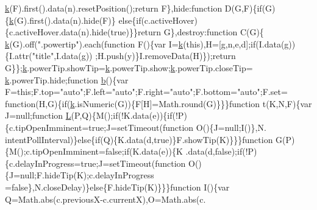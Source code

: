 \begin{DoxyCode}
      \hyperlink{jquery_8js_ab26645c014aa005ecedef329ecf58c99}{k}(F).first().data(n).resetPosition();\textcolor{keywordflow}{return} F\},hide:\textcolor{keyword}{function} D(G,F)\{\textcolor{keywordflow}{if}(G)\{\hyperlink{jquery_8js_ab26645c014aa005ecedef329ecf58c99}{k}(G).first().data(n).hide(F)\}\textcolor{keywordflow}{
      else}\{\textcolor{keywordflow}{if}(c.activeHover)\{c.activeHover.data(n).hide(\textcolor{keyword}{true})\}\}\textcolor{keywordflow}{return} G\},destroy:\textcolor{keyword}{function} C(G)\{
      \hyperlink{jquery_8js_ab26645c014aa005ecedef329ecf58c99}{k}(G).off(\textcolor{stringliteral}{".powertip"}).each(\textcolor{keyword}{function} F()\{var I=\hyperlink{jquery_8js_ab26645c014aa005ecedef329ecf58c99}{k}(\textcolor{keyword}{this}),H=[g,n,e,d];\textcolor{keywordflow}{if}(I.data(g))\{I.attr(\textcolor{stringliteral}{"title"},I.data(g))
      ;H.push(y)\}I.removeData(H)\});\textcolor{keywordflow}{return} G\}\};\hyperlink{jquery_8js_ab26645c014aa005ecedef329ecf58c99}{k}.powerTip.showTip=\hyperlink{jquery_8js_ab26645c014aa005ecedef329ecf58c99}{k}.powerTip.show;\hyperlink{jquery_8js_ab26645c014aa005ecedef329ecf58c99}{k}.powerTip.closeTip=
      \hyperlink{jquery_8js_ab26645c014aa005ecedef329ecf58c99}{k}.powerTip.hide;\textcolor{keyword}{function} \hyperlink{jquery_8js_aa4026ad5544b958e54ce5e106fa1c805}{b}()\{var F=\textcolor{keyword}{this};F.top=\textcolor{stringliteral}{"auto"};F.left=\textcolor{stringliteral}{"auto"};F.right=\textcolor{stringliteral}{"auto"};F.bottom=\textcolor{stringliteral}{"auto"};F.set=\textcolor{keyword}{
      function}(H,G)\{\textcolor{keywordflow}{if}(\hyperlink{jquery_8js_ab26645c014aa005ecedef329ecf58c99}{k}.isNumeric(G))\{F[H]=Math.round(G)\}\}\}\textcolor{keyword}{function} t(K,N,F)\{var J=null;\textcolor{keyword}{function} 
      \hyperlink{jquery_8js_a38ee4c0b5f4fe2a18d0c783af540d253}{L}(P,Q)\{M();\textcolor{keywordflow}{if}(!K.data(e))\{\textcolor{keywordflow}{if}(!P)\{c.tipOpenImminent=\textcolor{keyword}{true};J=setTimeout(\textcolor{keyword}{function} O()\{J=null;I()\},N.
      intentPollInterval)\}\textcolor{keywordflow}{else}\{\textcolor{keywordflow}{if}(Q)\{K.data(d,\textcolor{keyword}{true})\}F.showTip(K)\}\}\}\textcolor{keyword}{function} G(P)\{M();c.tipOpenImminent=\textcolor{keyword}{false};\textcolor{keywordflow}{if}(K.data(e))\{K
      .data(d,\textcolor{keyword}{false});\textcolor{keywordflow}{if}(!P)\{c.delayInProgress=\textcolor{keyword}{true};J=setTimeout(\textcolor{keyword}{function} O()\{J=null;F.hideTip(K);c.delayInProgress
      =\textcolor{keyword}{false}\},N.closeDelay)\}\textcolor{keywordflow}{else}\{F.hideTip(K)\}\}\}\textcolor{keyword}{function} I()\{var Q=Math.abs(c.previousX-c.currentX),O=Math.abs(c.

\end{DoxyCode}
